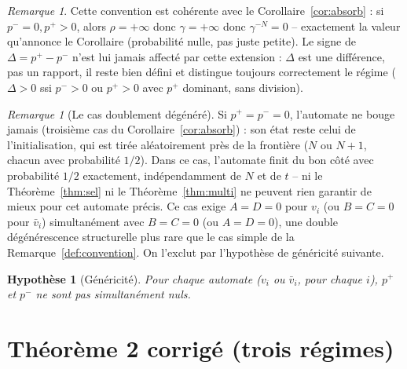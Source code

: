 \documentclass[11pt]{article}
\newtheorem{hypothesis}{Hypothèse}
\theoremstyle{remark}
\newtheorem{remark}[theorem]{Remarque}
\newcommand{\vbar}{\bar{v}}
\begin{document}
\begin{remark}
Cette convention est cohérente avec le Corollaire~\ref{cor:absorb} : si
$p^-=0,p^+>0$, alors $\rho=+\infty$ donc $\gamma=+\infty$ donc
$\gamma^{-N}=0$ -- exactement la valeur qu'annonce le Corollaire
(probabilité nulle, pas juste petite). Le signe de $\Delta=p^+-p^-$ n'est
lui jamais affecté par cette extension : $\Delta$ est une différence, pas
un rapport, il reste bien défini et distingue toujours correctement le
régime ($\Delta>0$ ssi $p^->0$ ou $p^+>0$ avec $p^+$ dominant, sans division).
\end{remark}

\begin{remark}[Le cas doublement dégénéré]\label{rem:frozen}
Si $p^+=p^-=0$, l'automate ne bouge jamais (troisième cas du
Corollaire~\ref{cor:absorb}) : son état reste celui de l'initialisation, qui
est tirée aléatoirement près de la frontière ($N$ ou $N+1$, chacun avec
probabilité $1/2$). Dans ce cas, l'automate finit du bon côté avec
probabilité $1/2$ exactement, indépendamment de $N$ et de $t$ -- ni le
Théorème~\ref{thm:sel} ni le Théorème~\ref{thm:multi} ne peuvent rien
garantir de mieux pour cet automate précis. Ce cas exige $A=D=0$ pour $v_i$
(ou $B=C=0$ pour $\vbar_i$) simultanément avec $B=C=0$ (ou $A=D=0$), une
double dégénérescence structurelle plus rare que le cas simple de la
Remarque~\ref{def:convention}. On l'exclut par l'hypothèse de généricité
suivante.
\end{remark}

\begin{hypothesis}[Généricité]\label{hyp:generic}
Pour chaque automate ($v_i$ ou $\vbar_i$, pour chaque $i$), $p^+$ et $p^-$
ne sont pas simultanément nuls.
\end{hypothesis}

\section{Théorème 2 corrigé (trois régimes)}
\end{document}
